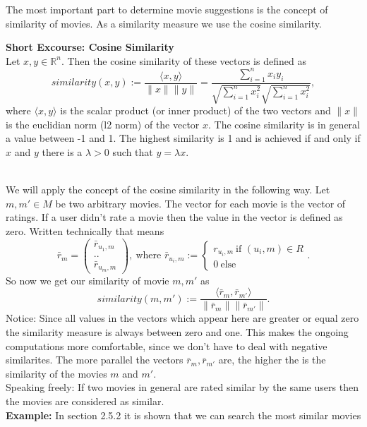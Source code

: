 \documentclass{article}
\begin{document}
The most important part to determine movie suggestions is the concept of similarity of movies. As a similarity measure we use the cosine similarity.\\[2ex]
\begin{boxedminipage}{\textwidth}
\textbf{Short Excourse: Cosine Similarity}\\[2ex]
Let $x, y \in \mathbb{R}^n$. Then the cosine similarity of these vectors is defined as
\[ similarity(x,y) := \frac{\langle x,y\rangle}{\lVert x\rVert \lVert y \rVert} = \frac{\sum_{i=1}^n x_i y_i}{\sqrt{\sum_{i=1}^nx_i^2}\sqrt{\sum_{i=1}^nx_i^2}},\]
where $\langle x,y\rangle$ is the scalar product (or inner product) of the two vectors and $\lVert x \rVert$ is the euclidian norm (l2 norm) of the vector $x$.
The cosine similarity is in general a value between -1 and  1. The highest similarity is 1 and is achieved if and only if $x$ and $y$ there is a $\lambda > 0$ such that $y = \lambda x$.
\end{boxedminipage}\\[2ex]
We will apply the concept of the cosine similarity in the following way. Let $m, m' \in M$ be two arbitrary movies. The vector for each movie is the vector of ratings. If a user didn't rate a movie then the value in the vector is defined as zero. Written technically that means
\[ \bar{r}_m = \begin{pmatrix} \bar{r}_{u_1,m} \\ .. \\ \bar{r}_{u_m, m}\end{pmatrix},~\text{where }\bar{r}_{u_i, m} := \begin{cases} r_{u_i,m}~\text{if }(u_i,m)\in R \\ 0~\text{else}\end{cases}.\]
So now we get our similarity of movie $m, m'$ as
\[ similarity(m,m'):= \frac{\langle \bar{r}_{m}, \bar{r}_{m'}\rangle}{\lVert \bar{r}_m \rVert \lVert \bar{r}_{m'} \rVert }.\]
Notice: Since all values in the vectors which appear here are greater or equal zero the similarity measure is always between zero and one. This makes the ongoing computations more comfortable, since we don't have to deal with negative similarites.
The more parallel the vectors $\bar{r}_m, \bar{r}_{m'}$ are, the higher the  is the similarity of the movies $m$ and $m'$.\\
Speaking freely: If two movies in general are rated similar by the same users then the movies are considered as similar.\\
\textbf{Example:} In section 2.5.2 it is shown that we can search the most similar movies 
\end{document}
